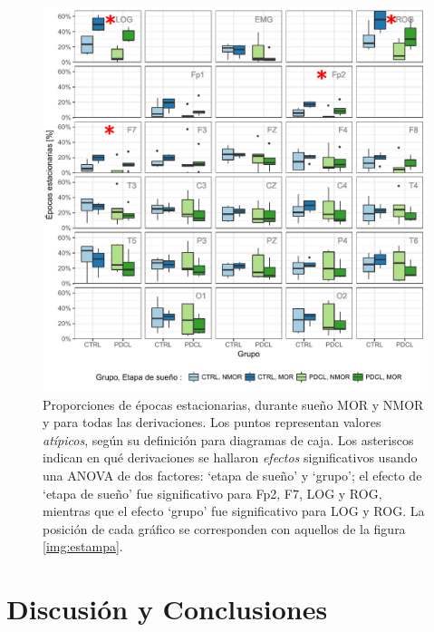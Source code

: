 \documentclass[12pt,letterpaper]{book}
\begin{document}
\begin{figure}
\centering
\includegraphics[width=\linewidth]
{./scripts_graf_res/comparacion_cabeza.pdf}
\caption{Proporciones de épocas estacionarias, durante sueño MOR y NMOR y para todas las derivaciones.
%
Los puntos representan valores \textit{atípicos}, según su definición para diagramas de caja.
%
Los asteriscos indican en qué derivaciones se hallaron \textit{efectos} significativos usando una ANOVA de dos factores: `etapa de sueño' y `grupo'; el efecto de `etapa de sueño' fue significativo para Fp2, F7, LOG y ROG, mientras que el efecto `grupo' fue significativo para LOG y ROG.
%
La posición de cada gráfico se corresponden con aquellos de la figura \ref{img:estampa}.}
\label{comparacion_verde}
\end{figure}


\chapter{Discusión y Conclusiones}
\end{document}
